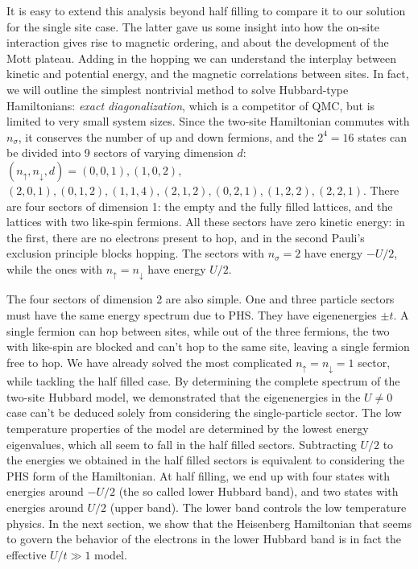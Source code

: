 It is easy to extend this analysis beyond half filling to compare it to our solution for the single site case.
The latter gave us some insight into how the on-site interaction gives rise to magnetic ordering, and about the development of the Mott plateau.
Adding in the hopping we can understand the interplay between kinetic and potential energy, and the magnetic correlations between sites.
In fact, we will outline the simplest nontrivial method to solve Hubbard-type Hamiltonians: \emph{exact diagonalization}, which is a competitor of \acs{QMC}, but is limited to very small system sizes.
Since the two-site Hamiltonian commutes with $n_\sigma$, it conserves the number of up and down fermions, and the $2^4 = 16$ states can be divided into 9 sectors of varying dimension $d$: $(n_\uparrow, n_\downarrow, d) = (0, 0, 1), (1, 0, 2),$
$ (2, 0, 1), (0, 1, 2), (1, 1, 4), (2, 1, 2), (0, 2, 1), (1, 2, 2), (2,2, 1)$.
There are four sectors of dimension 1: the empty and the fully filled lattices, and the lattices with two like-spin fermions.
All these sectors have zero kinetic energy: in the first, there are no electrons present to hop, and in the second Pauli's exclusion principle blocks hopping.
The sectors with $n_\sigma = 2$ have energy $- U / 2$, while the ones with $n_\uparrow = n_\downarrow$ have energy $U / 2$.

The four sectors of dimension 2 are also simple.
One and three particle sectors must have the same energy spectrum due to \acf{PHS}.
They have eigenenergies $\pm t$.
A single fermion can hop between sites, while out of the three fermions, the two with like-spin are blocked and can't hop to the same site, leaving a single fermion free to hop.
We have already solved the most complicated $n_\uparrow = n_\downarrow = 1$ sector, while tackling the half filled case.
By determining the complete spectrum of the two-site Hubbard model, we demonstrated that the eigenenergies in the $U \neq 0$ case can't be deduced solely from considering the single-particle sector.
The low temperature properties of the model are determined by the lowest energy eigenvalues, which all seem to fall in the half filled sectors.
Subtracting $U / 2$ to the energies we obtained in the half filled sectors is equivalent to considering the \acs{PHS} form of the Hamiltonian. 
At half filling, we end up with four states with energies around $-U / 2$ (the so called lower Hubbard band), and two states with energies around $U / 2$ (upper band).
The lower band controls the low temperature physics.
In the next section, we show that the Heisenberg Hamiltonian that seems to govern the behavior of the electrons in the lower Hubbard band is in fact the effective $U / t \gg 1$ model.

